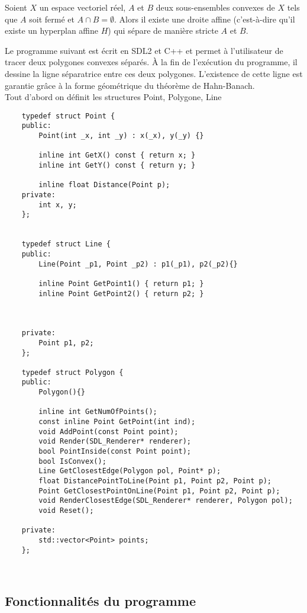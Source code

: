 \documentclass{article}
\theoremstyle{definition}
\theoremstyle{plain}
\begin{document}
Soient $X$ un espace vectoriel réel, $A$ et $B$ deux sous-ensembles convexes de $X$ tels que $A$ soit fermé et $A \cap B = \emptyset$. Alors il existe une droite affine (c'est-à-dire qu'il existe un hyperplan affine $H$) qui sépare de manière stricte $A$ et $B$.


Le programme suivant est écrit en SDL2 et C++ et permet à l'utilisateur de tracer deux polygones convexes séparés. À la fin de l'exécution du programme, il dessine la ligne séparatrice entre ces deux polygones. L'existence de cette ligne est garantie grâce à la forme géométrique du théorème de Hahn-Banach.\\


Tout d'abord on définit les structures Point, Polygone, Line
\lstset{language=C++}
\begin{lstlisting}
    typedef struct Point {
    public:
        Point(int _x, int _y) : x(_x), y(_y) {}
    
        inline int GetX() const { return x; } 
        inline int GetY() const { return y; }
    
        inline float Distance(Point p);
    private:
        int x, y;
    };


    typedef struct Line {
    public:
        Line(Point _p1, Point _p2) : p1(_p1), p2(_p2){}

        inline Point GetPoint1() { return p1; }
        inline Point GetPoint2() { return p2; }



    private:
        Point p1, p2;
    };

    typedef struct Polygon {
    public:
        Polygon(){}

        inline int GetNumOfPoints();
        const inline Point GetPoint(int ind);
        void AddPoint(const Point point);
        void Render(SDL_Renderer* renderer);
        bool PointInside(const Point point);
        bool IsConvex();
        Line GetClosestEdge(Polygon pol, Point* p);
        float DistancePointToLine(Point p1, Point p2, Point p);
        Point GetClosestPointOnLine(Point p1, Point p2, Point p);
        void RenderClosestEdge(SDL_Renderer* renderer, Polygon pol);
        void Reset();

    private:
        std::vector<Point> points;
    };



\end{lstlisting}



\subsection{Fonctionnalités du programme}
\end{document}
